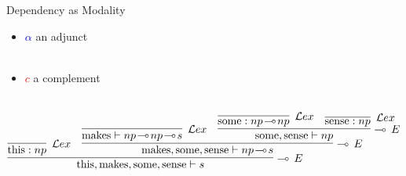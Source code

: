 \documentclass[aspectratio=169]{beamer}
\newcommand{\li}{\!\multimap\!}
\begin{document}
\begin{frame}{Dependency as Modality}
{{		\begin{itemize}
			\item[] \textcolor{blue}{$\alpha$} an adjunct \\
			~
			\item[] \textcolor{red}{$c$} a complement\\
			~
		\end{itemize}
		\vfill
		
	}
	{
	\smaller
	\[
		\infer[\li~ E]{\text{this}, \text{makes}, \text{some}, \text{sense} \vdash s}{
			\infer[\mathcal{L}ex]{\text{this}: np}{}
			&
			\infer[\li~ E]{\text{makes}, \text{some}, \text{sense} \vdash np\li s}{
				\infer[\mathcal{L}ex]{\text{makes} \vdash np\li np\li s}{}
				&
				\infer[\li~ E]{\text{some}, \text{sense} \vdash np}{
					\infer[\mathcal{L}ex]{\text{some}: np\li np}{}
					&
					\infer[\mathcal{L}ex]{\text{sense}: np}{}
				}
			}
		}
	\]
	}}
 \end{frame}
 
 \newcommand{\etext}[1]{\scriptsize {\textit{#1}}}
\end{document}
